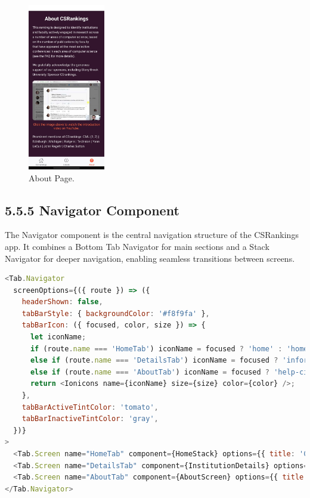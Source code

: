 \documentclass[12pt]{article}
\begin{document}
\begin{figure}[H]
    \centering
    \includegraphics[width=0.3\textwidth, height=0.5\textheight]{about.jpg} %
    \caption{About Page.}
    \label{fig:example_image}
\end{figure}


\subsection*{5.5.5 Navigator Component}
The Navigator component is the central navigation structure of the CSRankings app. It combines a Bottom Tab Navigator for main sections and a Stack Navigator for deeper navigation, enabling seamless transitions between screens.

\begin{lstlisting}[language=JavaScript, caption={Navigator Component Implementation}, label={lst:NavigatorComponent}]
<Tab.Navigator
  screenOptions={({ route }) => ({
    headerShown: false,
    tabBarStyle: { backgroundColor: '#f8f9fa' },
    tabBarIcon: ({ focused, color, size }) => {
      let iconName;
      if (route.name === 'HomeTab') iconName = focused ? 'home' : 'home-outline';
      else if (route.name === 'DetailsTab') iconName = focused ? 'information-circle' : 'information-circle-outline';
      else if (route.name === 'AboutTab') iconName = focused ? 'help-circle' : 'help-circle-outline';
      return <Ionicons name={iconName} size={size} color={color} />;
    },
    tabBarActiveTintColor: 'tomato',
    tabBarInactiveTintColor: 'gray',
  })}
>
  <Tab.Screen name="HomeTab" component={HomeStack} options={{ title: 'CSRankings' }} />
  <Tab.Screen name="DetailsTab" component={InstitutionDetails} options={{ title: 'Details' }} />
  <Tab.Screen name="AboutTab" component={AboutScreen} options={{ title: 'About' }} />
</Tab.Navigator>
\end{lstlisting}
\end{document}
